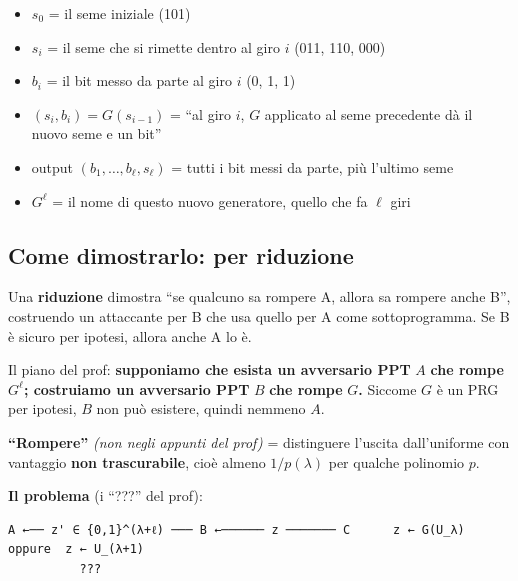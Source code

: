 \begin{itemize}
\tightlist
\item
  \(s_0\) = il seme iniziale (101)
\item
  \(s_i\) = il seme che si rimette dentro al giro \(i\) (011, 110, 000)
\item
  \(b_i\) = il bit messo da parte al giro \(i\) (0, 1, 1)
\item
  \((s_i, b_i) = G(s_{i-1})\) = ``al giro \(i\), \(G\) applicato al seme precedente dà il nuovo seme e un bit''
\item
  output \((b_1, \dots, b_\ell, s_\ell)\) = tutti i bit messi da parte, più l'ultimo seme
\item
  \(G^\ell\) = il nome di questo nuovo generatore, quello che fa \(\ell\) giri
\end{itemize}

\subsection{Come dimostrarlo: per riduzione}

\begin{inbreve}

Una \textbf{riduzione} dimostra ``se qualcuno sa rompere A, allora sa rompere anche B'', costruendo un attaccante per B che usa quello per A come sottoprogramma. Se B è sicuro per ipotesi, allora anche A lo è.

\end{inbreve}

Il piano del prof: \textbf{supponiamo che esista un avversario PPT} \(A\) \textbf{che rompe} \(G^\ell\)\textbf{; costruiamo un avversario PPT} \(B\) \textbf{che rompe} \(G\)\textbf{.} Siccome \(G\) è un PRG per ipotesi, \(B\) non può esistere, quindi nemmeno \(A\).

\begin{nota}

\textbf{``Rompere''} \emph{(non negli appunti del prof)} = distinguere l'uscita dall'uniforme con vantaggio \textbf{non trascurabile}, cioè almeno \(1/p(\lambda)\) per qualche polinomio \(p\).

\end{nota}

\textbf{Il problema} (i ``???'' del prof):

\begin{verbatim}
A ←── z' ∈ {0,1}^(λ+ℓ) ─── B ←────── z ─────── C      z ← G(U_λ)  oppure  z ← U_(λ+1)
          ???
\end{verbatim}

